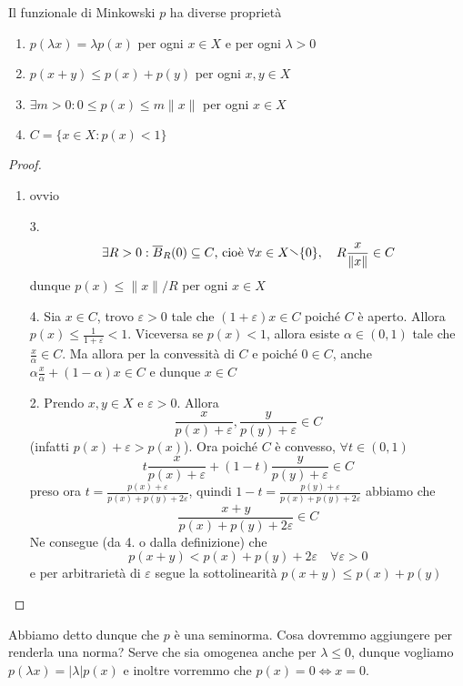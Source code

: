 \begin{lemmao} Il funzionale di Minkowski \(p\) ha diverse proprietà
\begin{enumerate}[label = \arabic*.]
    \item \(p {(\lambda x )} = \lambda p {(x)}\) per ogni \(x \in X\)  e per ogni
        \(\lambda > 0\) 
    \item \(p{(x + y)} \le p {(x)} + p {(y)}\) per ogni \(x, y \in X\) 
    \item \(\exists  m > 0 : 0 \le p {(x)} \le m \|x\|\) per ogni \(x \in X\) 
    \item \(C = \{ x \in X : p {( x)} <1\} \) 
\end{enumerate}
\end{lemmao}
\begin{proof}{}
\begin{enumerate}[label = \arabic*.]
    \item ovvio
    \item[3.] \[
          \exists R > 0 : \overline{B}_R {(0)} \subseteq C \text{, cioè } \forall x \in X \sminus \{0\}, \quad R \frac{x}{\|x\|} \in C
        \]
        dunque \(p {(x)} \le \|x\|/R\) per ogni \(x \in X\) 
    \item[4.] Sia \(x \in C\), trovo \(\varepsilon > 0\) tale che \({(1+\varepsilon)}x \in C\) poiché \(C\) è aperto. Allora \(p{(x)} \le \frac{1}{1+\varepsilon} < 1\).
        Viceversa se \(p {(x)} < 1\), allora esiste \(\alpha \in (0,1)\) tale
        che \(\frac{x}{\alpha} \in C\). Ma allora per la convessità di \(C\) e
        poiché \(0 \in C\), anche \(\alpha \frac{x}{\alpha} + {(1-\alpha)}x \in C\) e dunque \(x \in C\) 
    \item[2.] Prendo \(x,y \in X\) e \(\varepsilon > 0\). Allora
        \[
          \frac{x}{p{(x)} + \varepsilon}, \frac{y}{p{(y)} + \varepsilon} \in C
        \]
        (infatti \(p{(x)} + \varepsilon > p {(x)}\)). Ora poiché \(
        C\) è convesso, \(\forall t \in (0, 1)\) 
        \[
          t \frac{x}{p{(x)} + \varepsilon} + {(1-t)} \frac{y}{p{(y)} +\varepsilon } \in C
        \]
        preso ora \(t = \frac{p{(x)} + \varepsilon}{p {(x)} + p {(y)} + 2\varepsilon}\), quindi \(
        1-t = \frac{p {(y)} + \varepsilon}{p {(x)} + p {(y)} + 2\varepsilon}\)
        abbiamo che
        \[
            \frac{x + y}{p {(x)} + p {(y)} + 2\varepsilon} \in C
        \]
        Ne consegue (da 4. o dalla definizione) che
        \[
          p {( x + y)} < p {(x)} + p {(y)} + 2\varepsilon \quad \forall \varepsilon > 0
        \]
        e per arbitrarietà di \(\varepsilon\) segue la sottolinearità
        \(
          p {(x+y)} \le p {(x)} + p {(y)}
        \)
        
\end{enumerate}
\end{proof}
    Abbiamo detto dunque che \(p\) è una seminorma. Cosa dovremmo aggiungere per
    renderla una norma? Serve che sia omogenea anche per \(\lambda \le 0\),
    dunque vogliamo \(p {( \lambda x)} = |\lambda| p {(x)}\) e inoltre vorremmo
    che \(p {(x)} = 0 \iff x =0\).

